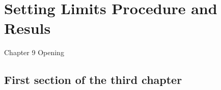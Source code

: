 \chapter{Setting Limits Procedure and Resuls}
\label{ChapterResult}

\ifpdf
    \graphicspath{{Chapter9/Figs/Raster/}{Chapter9/Figs/PDF/}{Chapter9/Figs/}}
\else
    \graphicspath{{Chapter9/Figs/Vector/}{Chapter9/Figs/}}
\fi


Chapter 9 Opening


\section{First section of the third chapter}
